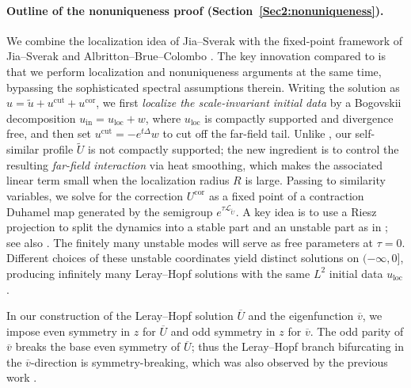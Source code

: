 \documentclass[11pt,a4paper]{article}
\numberwithin{equation}{section}
\newcommand{\tmop}[1]{\ensuremath{\operatorname{#1}}}
\begin{document}
\paragraph{Outline of the nonuniqueness proof (Section~\ref{Sec2:nonuniqueness}).}
We combine the localization idea of Jia--Sverak \cite{jia2015incompressible} with the fixed-point framework of Jia--Sverak \cite{jia2015incompressible} and Albritton--Brue--Colombo \cite{albritton2022non}. {The key innovation compared to \cite{jia2015incompressible} is that we perform localization and nonuniqueness arguments at the same time, bypassing the sophisticated spectral assumptions therein.} Writing the solution as
\(u=\widetilde u+u^{\mathrm{cut}}+u^{\mathrm{cor}}\), we first \emph{localize the scale-invariant initial data} by a Bogovskii
decomposition \(u_{\mathrm{in}}=u_{\tmop{loc}}+w\), where \(u_{\tmop{loc}}\) is compactly supported and divergence free, and then set
\(u^{\mathrm{cut}}=-e^{t\Delta}w\) to cut off the far-field tail. Unlike \cite{albritton2022non}, our
self-similar profile \(\widetilde U\) is not compactly supported; the new ingredient is to control the
resulting \emph{far-field interaction} via heat smoothing, which makes the associated linear term small when the localization radius \(R\) is large. Passing to similarity variables, we solve for the
correction \(U^{\mathrm{cor}}\) as a fixed point of a contraction Duhamel map generated by the semigroup
\(e^{\tau\mathcal L_{\widetilde U}}\). A key idea is to use a Riesz projection to split the dynamics into a stable part and an unstable part as in \cite{jia2015incompressible}; see also \cite{chen2024vorticity, chen2025vorticity}.  The finitely many unstable modes will serve as free parameters at
\(\tau=0\). Different choices of these unstable coordinates yield distinct solutions on
\((-\infty,0]\), producing infinitely many Leray--Hopf solutions with the same \(L^2\) initial data \(u_{\tmop{loc}}\).

In our construction of the Leray--Hopf solution $\overline U$ and the eigenfunction $\overline v$, 
we impose even symmetry in $z$ for $\overline U$ and odd symmetry in $z$ for $\overline v$. The odd parity of $\overline v$ breaks the base even symmetry of $\overline U$; thus the Leray--Hopf branch bifurcating in the $\overline v$-direction is symmetry-breaking, which was also observed by the previous work  \cite{guillod2023numerical,albritton2022non}.
\end{document}
